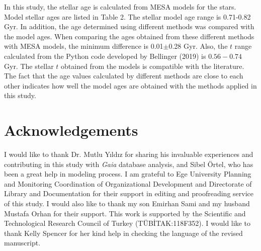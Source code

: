 \documentclass[a4paper,fleqn,usenatbib]{mnras}     %
\begin{document}
{%
In this study, the stellar age is calculated 
from {\small {MESA}} models for the stars. 
Model stellar ages are listed in Table 2.
The stellar model age range is 0.71-0.82 Gyr.
In addition, the age determined using different methods 
was compared with the model ages.
When comparing the ages obtained from these different 
methods with {\small {MESA}} models,
 the minimum difference is 0.01$\pm$0.28 Gyr.
Also, the $t$ range calculated from the Python code developed 
by Bellinger (2019) is $0.56-0.74$ Gyr. 
The stellar $t$ obtained from the models is 
compatible with the literature.
The fact that the age values calculated by different 
methods are close to each other indicates how well the model ages are obtained with the methods applied in this study. 

\section*{Acknowledgements}
I would like to thank 
Dr. Mutlu Y{\i}ld{\i}z for sharing his 
invaluable experiences and contributing 
in this study with \textit{Gaia} database analysis, 
and Sibel \"{O}rtel, who has been a great help in modeling process.
I am grateful to Ege University Planning 
and Monitoring Coordination of Organizational 
Development and Directorate of Library and Documentation for their support in editing and proofreading service of this study. 
I would also like to 
thank my son Emirhan Sami and
my husband Mustafa Orhan for their support. 
This work is supported by the Scientific and Technological Research Council of Turkey (T\"{U}B\.{I}TAK:118F352).
I would like to thank Kelly Spencer for her kind help in checking the language of the revised manuscript.

}
\end{document}
